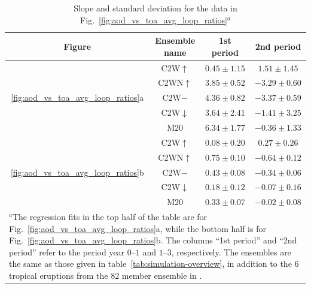 \documentclass[draft]{agujournal2019}
\newcommand{\cwmp}{C2W\(-\)}
\newcommand{\cwm}{C2W\(\downarrow\)}
\newcommand{\cws}{C2WN\(\uparrow\)}
\newcommand{\cwsn}{C2W\(\uparrow\)}
\begin{document}
\begin{table}
  \centering

  \caption{Slope and standard deviation for the data in
    Fig.~\ref{fig:aod_vs_toa_avg_loop_ratios}\(^{a}\)}\label{tab:slope-gradients}%
  \begin{tabular}{cccc}
    \toprule
    Figure                                                  & Ensemble name & 1st period      & 2nd period       \\
    \midrule
                                                            & \cwsn{}   & \(0.45\pm1.15\) & \(1.51\pm1.45\)  \\
                                                            & \cws{}    & \(3.85\pm0.52\) & \(-3.29\pm0.60\) \\
    \ref{fig:aod_vs_toa_avg_loop_ratios}a                   & \cwmp{}   & \(4.36\pm0.82\) & \(-3.37\pm0.59\) \\
                                                            & \cwm{}    & \(3.64\pm2.41\) & \(-1.41\pm3.25\) \\
                                                            & M20     & \(6.34\pm1.77\) & \(-0.36\pm1.33\) \\
    \midrule
                                                            & \cwsn{}   & \(0.08\pm0.20\) & \(0.27\pm0.26\)  \\
                                                            & \cws{}    & \(0.75\pm0.10\) & \(-0.64\pm0.12\) \\
    \ref{fig:aod_vs_toa_avg_loop_ratios}b                   & \cwmp{}   & \(0.43\pm0.08\) & \(-0.34\pm0.06\) \\
                                                            & \cwm{}    & \(0.18\pm0.12\) & \(-0.07\pm0.16\) \\
                                                            & M20     & \(0.33\pm0.07\) & \(-0.02\pm0.08\) \\
    \toprule
    \multicolumn{4}{l}{\parbox{\linewidth}{\(^{a}\)The regression fits in the top half of the
    table are for Fig.~\ref{fig:aod_vs_toa_avg_loop_ratios}a, while the bottom half is for
    Fig.~\ref{fig:aod_vs_toa_avg_loop_ratios}b. The columns ``1st period'' and ``2nd
    period'' refer to the period year \(0\)--\(1\) and \(1\)--\(3\), respectively. The
    ensembles are the same as those given in table~\ref{tab:simulation-overview}, in
    addition to the \(6\) tropical eruptions from the \(82\) member ensemble in
    .}} \\
  \end{tabular}
\end{table}
\end{document}
